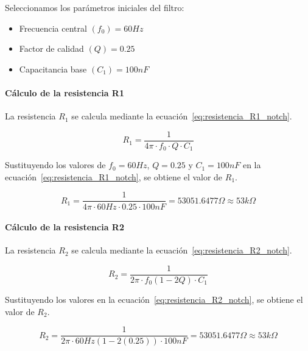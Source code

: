         Seleccionamos los parámetros iniciales del filtro:
        \begin{itemize}
            \item Frecuencia central $(f_0) = 60 Hz$
            \item Factor de calidad $(Q) = 0.25$
            \item Capacitancia base $(C_1) = 100 nF$
        \end{itemize}

        \paragraph{Cálculo de la resistencia R1}
        La resistencia $R_1$ se calcula mediante la ecuación~\ref{eq:resistencia_R1_notch}.

        \begin{equation}
            \label{eq:resistencia_R1_notch}
            R_1 = \frac{1}{4\pi \cdot f_0 \cdot Q \cdot C_1}
        \end{equation}

        Sustituyendo los valores de $f_0 = 60 Hz$, $Q = 0.25$ y $C_1 = 100 nF$ en la ecuación~\ref{eq:resistencia_R1_notch}, se obtiene el valor de $R_1$.

        \begin{equation}
            R_1 = \frac{1}{4\pi \cdot 60 Hz \cdot 0.25 \cdot 100 nF} = 53051.6477 \Omega \approx 53 k\Omega
        \end{equation}

        \paragraph{Cálculo de la resistencia R2}
        La resistencia $R_2$ se calcula mediante la ecuación~\ref{eq:resistencia_R2_notch}.

        \begin{equation}
            \label{eq:resistencia_R2_notch}
            R_2 = \frac{1}{2\pi \cdot f_0 (1 - 2Q) \cdot C_1}
        \end{equation}

        Sustituyendo los valores en la ecuación~\ref{eq:resistencia_R2_notch}, se obtiene el valor de $R_2$.

        \begin{equation}
            R_2 = \frac{1}{2\pi \cdot 60 Hz(1 - 2(0.25)) \cdot 100 nF} = 53051.6477 \Omega \approx 53 k\Omega
        \end{equation}

